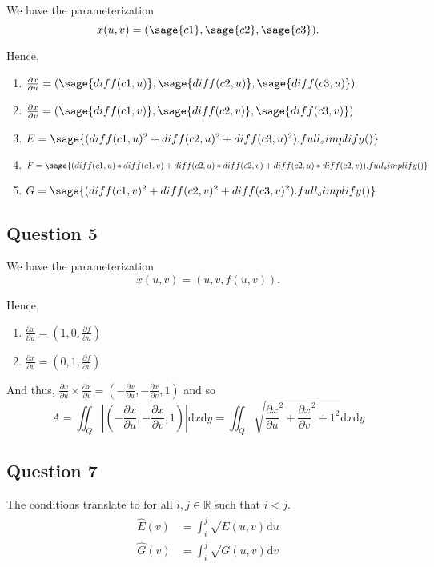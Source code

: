 \documentclass[12pt]{article}
\begin{document}
We have the parameterization 
$$x(u,v) = (\sage{c1}, \sage{c2}, \sage{c3}).$$

Hence,

\begin{enumerate}
\item $\frac{ \partial x}{\partial u} = (\sage{diff(c1,u)}, \sage{diff(c2, u)}, \sage{diff(c3,u)})$ 
\item $\frac{ \partial x}{\partial v} = (\sage{diff(c1,v)}, \sage{diff(c2, v)}, \sage{diff(c3,v)})$
\item $E = \sage{(diff(c1,u)^2 + diff(c2,u)^2 + diff(c3,u)^2).full_simplify()}$
\item $F = \sage{(diff(c1,u)*diff(c1,v) + diff(c2,u)*diff(c2,v) + diff(c2,u)*diff(c2,v)).full_simplify()}$ 
\item $G = \sage{(diff(c1,v)^2 + diff(c2,v)^2 + diff(c3,v)^2).full_simplify()}$
\end{enumerate}

\subsection*{Question 5}

We have the parameterization 
$$x(u,v) = (u,v, f(u,v)).$$

Hence,

\begin{enumerate}
\item $\frac{ \partial x}{\partial u} = (1, 0, \frac{ \partial f}{\partial u})$ 
\item $\frac{ \partial x}{\partial v} = (0,1, \frac{ \partial f}{\partial v})$
\end{enumerate}

And thus, $\frac{ \partial x}{\partial u} \times \frac{ \partial x}{\partial v} = (-\frac{ \partial x}{\partial u} ,-\frac{ \partial x}{\partial v}, 1)$
and so 
$$ A = \iint_Q |(-\frac{ \partial x}{\partial u} ,-\frac{ \partial x}{\partial v}, 1)| \mathrm dx \mathrm dy = \iint_Q \sqrt{\frac{ \partial x}{\partial u}^2 +\frac{ \partial x}{\partial v}^2 + 1^2} \mathrm dx \mathrm dy$$

\subsection*{Question 7}

The conditions translate to for all $i, j \in \mathbb R$ such that $i < j$.
\begin{align}
    \begin{split}
        \hat{E}(v) &= \int_i^j \sqrt{E(u,v)} \mathrm{d}u\\
        \hat{G}(v) &= \int_i^j \sqrt{G(u,v)} \mathrm{d}v
    \end{split}
\end{align}
\end{document}
